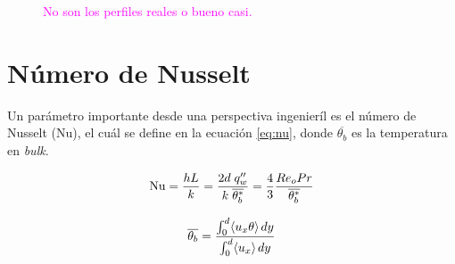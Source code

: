 \begin{figure}[H]
  \centering
  \caption{\textcolor{magenta}{No son los perfiles reales o bueno casi.}}
  \label{fig:ux-Re3150-Pr0071}
\end{figure}



\newpage
\section{Número de Nusselt} \label{sec:nu}

Un parámetro importante desde una perspectiva ingenieríl es el número de Nusselt (Nu), el cuál se define en la ecuación \ref{eq:nu}, donde $\overline{\theta_b}$ es la temperatura en \textit{bulk}.

\begin{equation}
\text{Nu} = \frac{h L}{k} = \frac{2d \hspace*{1mm} q''_w}{k \hspace*{1mm} \overline{\theta^*_b}} = \frac{4}{3} \frac{Re_o Pr}{\overline{\theta^*_b}}	
\label{eq:nu}
\end{equation}

\begin{equation*}
\overline{\theta_b} = \frac{\int^d_0 \langle u_x \theta \rangle \hspace*{0.5mm} dy }{\int^d_0 \langle u_x \rangle \hspace*{0.5mm} dy}
\end{equation*}

